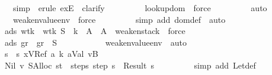 \begin{isabellebody}
\ \ \ \ \ \ \ \ \isamarkupfalse \ simp\ \isamarkupfalse \ {\isacharparenleft}erule\ exE{\isacharparenright}\ \isamarkupfalse \ clarify\isanewline
\ \ \ \ \ \ \ \ \isamarkupfalse \ lookup{\isacharunderscore}dom\ \isamarkupfalse \ force\isanewline
\ \ \ \ \ \ \ \ \isamarkupfalse \ auto\isanewline
\ \ \ \ \ \ \ \ \isamarkupfalse \ weaken{\isacharunderscore}value{\isacharunderscore}env\ \isamarkupfalse \ force\isanewline
\ \ \ \ \ \ \ \ \isamarkupfalse \ {\isacharparenleft}simp\ add{\isacharcolon}\ dom{\isacharunderscore}def{\isacharparenright}\ \isamarkupfalse \ auto\ \isamarkupfalse \isanewline
\ \ \ \ \ \ \isamarkupfalse \ ads\ wt{\isacharunderscore}k\ \isamarkupfalse \ wt{\isacharunderscore}k{}{\isacharcolon}\ {\isachardoublequoteopen}{\isacharquery}S{}\ {\isasymturnstile}\ k\ {\isacharcolon}\ A{\isacharprime}\ {\isasymRightarrow}\ A{\isachardoublequoteclose}\ \isamarkupfalse \ weaken{\isacharunderscore}stack\ \isamarkupfalse \ force\isanewline
\ \ \ \ \ \ \isamarkupfalse \ ads\ gr\ \isamarkupfalse \ gr{\isacharunderscore}{}{\isacharcolon}\ {\isachardoublequoteopen}{\isasymGamma}{\isacharsemicolon}\ {\isacharquery}S{}\ {\isasymturnstile}\ {\isasymrho}{\isachardoublequoteclose}\isanewline
\ \ \ \ \ \ \ \ \isamarkupfalse \ weaken{\isacharunderscore}value{\isacharunderscore}env\ \isamarkupfalse \ auto\ \isamarkupfalse \isanewline
\ \ \ \ \ \ \isamarkupfalse \ {\isacharquery}s{}\ {\isacharequal}\ {\isachardoublequoteopen}{\isacharparenleft}s{\isacharprime}{\isacharcomma}\ {\isacharparenleft}x{\isacharcomma}VRef\ {\isacharquery}a{\isacharparenright}{\isacharhash}{\isasymrho}{\isacharcomma}\ k{\isacharcomma}\ {\isacharparenleft}{\isacharquery}a{\isacharcomma}{\isacharparenleft}Val\ v{\isacharcomma}B{\isacharparenright}{\isacharparenright}{\isacharhash}{\isasymmu}{\isacharcomma}\ {\isacharbrackleft}{\isacharbrackright}{\isacharparenright}{\isachardoublequoteclose}\isanewline
\ \ \ \ \ \ \isamarkupfalse \ Nil\ v\ SAlloc\ st\ \isamarkupfalse \ step{\isacharunderscore}s{\isacharcolon}\ {\isachardoublequoteopen}step\ s\ {\isacharequal}\ Result\ {\isacharquery}s{}{\isachardoublequoteclose}\isanewline
\ \ \ \ \ \ \ \ \isamarkupfalse \ {\isacharparenleft}simp\ add{\isacharcolon}\ Let{\isacharunderscore}def{\isacharparenright}\ \isamarkupfalse \isanewline

\end{isabellebody}
